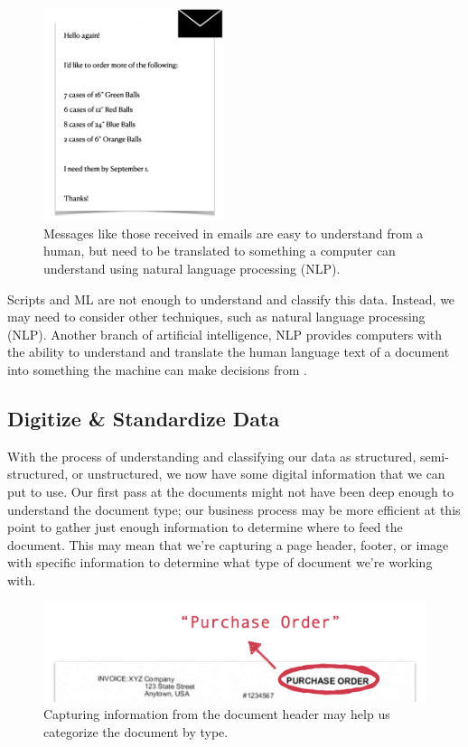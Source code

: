\documentclass[conference]{IEEEtran}
\begin{document}
\begin{figure}[ht]
\centerline{\includegraphics[width=150pt]{UnstructuredEmailExample.png}}
\caption{Messages like those received in emails are easy to understand from a human, but need to be translated to something a computer can understand using natural language processing (NLP).}
\label{figUnstructuredEmailExample}
\end{figure}

Scripts and ML are not enough to understand and classify this data. Instead, we may need to consider other techniques, such as natural language processing (NLP). Another branch of artificial intelligence, NLP provides computers with the ability to understand and translate the human language text of a document into something the machine can make decisions from \cite{ibm:nlp}.

\subsection{Digitize \& Standardize Data}
With the process of understanding and classifying our data as structured, semi-structured, or unstructured, we now have some digital information that we can put to use. Our first pass at the documents might not have been deep enough to understand the document type; our business process may be more efficient at this point to gather just enough information to determine where to feed the document. This may mean that we're capturing a page header, footer, or image with specific information to determine what type of document we're working with. 

\begin{figure}[ht]
\centerline{\includegraphics[width=\columnwidth]{DocumentHeader.png}}
\caption{Capturing information from the document header may help us categorize the document by type.}
\label{figDocumentHeader}
\end{figure}
\end{document}
